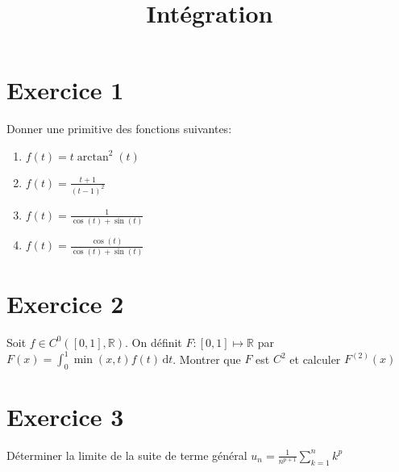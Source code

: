 \documentclass[11pt]{article}
\author{\Name \texttt{\Login}}
\date{}
\title{Int\'egration}
\begin{document}
\maketitle

\section*{Exercice 1}

Donner une primitive des fonctions suivantes:
\vspace{2ex}

\begin{enumerate}


\item $f(t)=t\arctan^2(t)$

\item $ f(t)=\frac{t+1}{(t-1)^2} $

\item $ f(t) = \frac{1}{\cos(t)+\sin(t)} $

\item $ f(t) = \frac{\cos(t)}{\cos(t)+\sin(t)} $
\end{enumerate}


\section*{Exercice 2}

Soit $f\in C^0([0,1],\mathbb{R})$. On définit $F:[0,1]\mapsto\mathbb{R}$ par $F(x)=\int_{0}^{1} \min(x,t)f(t)\, \mathrm{d}t$. Montrer que $F$ est $C^2$ et calculer $F^{(2)}(x)$

\section*{Exercice 3}

Déterminer la limite de la suite de terme général $u_n=\frac{1}{n^{p+1}}\sum_{k=1}^{n}k^p$
\end{document}
